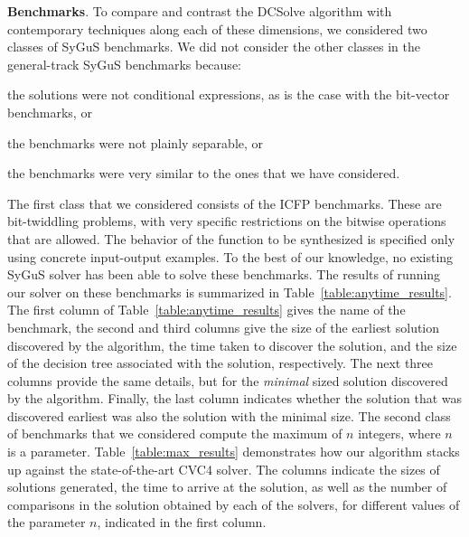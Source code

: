 \documentclass{llncs}
\newcommand{\sygus}{{\sffamily\fontsize{8.5}{10}\selectfont
    SyGuS}\xspace}
\newcommand{\dcsolve}{{\sffamily\fontsize{8.5}{10}\selectfont
    DCSolve}\xspace}
\renewcommand{\paragraph}[1]{\par\noindent\textbf{#1}.}
\begin{document}
\paragraph{Benchmarks}
To compare and contrast the \dcsolve algorithm with contemporary
techniques along each of these dimensions, we considered two classes
of \sygus benchmarks. We did not consider the other classes in the
general-track \sygus benchmarks because:
\begin{inparaenum}[(a)]
\item the solutions were not conditional expressions, as is the case
with the bit-vector benchmarks, or
\item the benchmarks were not plainly separable, or
\item the benchmarks were very similar to the ones that we have
considered.
\end{inparaenum}
The first class that we considered consists of the ICFP
benchmarks. These are bit-twiddling problems, with very specific
restrictions on the bitwise operations that are allowed. The behavior
of the function to be synthesized is specified only using concrete
input-output examples. To the best of our knowledge, no existing
\sygus solver has been able to solve these benchmarks. The results of
running our solver on these benchmarks is summarized in
Table~\ref{table:anytime_results}. The first column of
Table~\ref{table:anytime_results} gives the name of the benchmark, the
second and third columns give the size of the earliest solution
discovered by the algorithm, the time taken to discover the solution,
and the size of the decision tree associated with the solution,
respectively. The next three columns provide the same details, but for
the \emph{minimal} sized solution discovered by the
algorithm. Finally, the last column indicates whether the solution
that was discovered earliest was also the solution with the minimal
size. The second class of benchmarks that we considered compute the
maximum of $n$ integers, where $n$ is a
parameter. Table~\ref{table:max_results} demonstrates how our
algorithm stacks up against the state-of-the-art CVC4 solver. The
columns indicate the sizes of solutions generated, the time to arrive
at the solution, as well as the number of comparisons in the solution
obtained by each of the solvers, for different values of the parameter
$n$, indicated in the first column.
\end{document}
